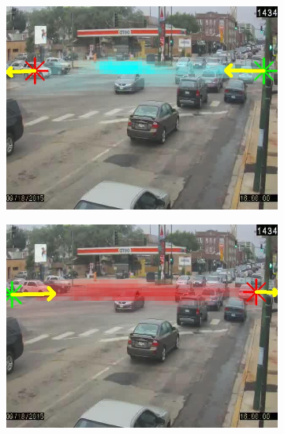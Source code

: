 \begin{figure}
    \centering
        \begin{subfigure}{0.32\linewidth}
            \includegraphics[width=\linewidth]{./img/scene_learning/res/diverseyWestern/diverseyWestern-0.jpg}
        \end{subfigure}
        \begin{subfigure}{0.32\linewidth}
            \includegraphics[width=\linewidth]{./img/scene_learning/res/diverseyWestern/diverseyWestern-1.jpg}
        \end{subfigure}
        \begin{subfigure}{0.32\linewidth}

\end{subfigure}
\end{figure}

